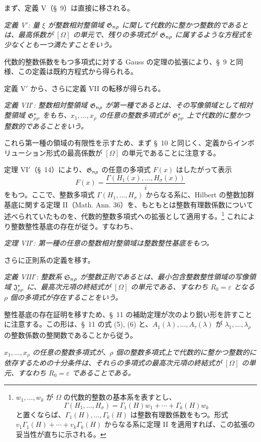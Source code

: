 \documentclass[11pt]{jlreq}
\newcommand{\eps}{\varepsilon}
\begin{document}
まず、定義 V（\S\ 9）は直接に移される。

\emph{定義 V$'$: 量 $\xi$ が整数相対整領域 $\mathfrak{G}_{n\rho}$ に関して代数的に整かつ整数的であるとは、最高係数が $[\Omega]$ の単元で、残りの多項式が $\mathfrak{G}_{n\rho}$ に属するような方程式を少なくとも一つ満たすことをいう。}

代数的整数係数をもつ多項式に対する Gauss の定理の拡張により、\S\ 9 と同様、この定義は既約方程式から得られる。

定義 V$'$ から、さらに定義 VII の転移が得られる。

\emph{定義 VII$'$: 整数相対整領域 $\mathfrak{G}_{n\rho}$ が第一種であるとは、その写像領域として相対整領域 $\mathfrak{G}^*_{\rho\rho}$ をもち、$x_1,\ldots,x_\rho$ の任意の整数多項式が $\mathfrak{G}^*_{\rho\rho}$ 上で代数的に整かつ整数的であることをいう。}

これら第一種の領域の有限性を示すため、まず \S\ 10 と同じく、定義からインボリューション形式の最高係数が $[\Omega]$ の単元であることに注意する。

定理 VI$'$（\S\ 14）により、$\mathfrak{G}_{n\rho}$ の任意の多項式 $F(x)$ はしたがって表示
\[
  F(x)=\frac{\Gamma(H_1(x),\ldots,H_\sigma(x))}{i}
\]
をもつ。ここで、整数多項式 $\Gamma(H_1,\ldots,H_\sigma)$ からなる系に、Hilbert の整数加群基底に関する定理 II（Math. Ann. 36）を、もともとは整数有理数係数について述べられていたものを、代数的整数多項式への拡張として適用する。\footnote{$w_1,\ldots,w_k$ が $\Omega$ の代数的整数の基本系を表すとし、
\[
  \Gamma(H_1,\ldots,H_\sigma)=\Gamma_1(H)w_1+\cdots+\Gamma_k(H)w_k
\]
と置くならば、$\Gamma_1(H),\ldots,\Gamma_k(H)$ は整数有理数係数をもつ。形式 $v_1\Gamma_1(H)+\cdots+v_k\Gamma_k(H)$ からなる系に定理 II を適用すれば、この拡張の妥当性が直ちに示される。} これにより整数整性基底の存在が従う。すなわち、

\emph{定理 VII$'$: 第一種の任意の整数相対整領域は整数整性基底をもつ。}

さらに正則系の定義を移す。

\emph{定義 VIII$'$: 整数系 $\mathfrak{S}_{n\rho}$ が整数正則であるとは、最小包含整数整性領域の写像領域 $\mathfrak{J}^*_{\rho\rho}$ に、最高次元項の終結式が $[\Omega]$ の単元である、すなわち $R_0=\eps$ となる $\rho$ 個の多項式が存在することをいう。}

整性基底の存在証明を移すため、\S\ 11 の補助定理が次のより鋭い形を許すことに注意する。この形は、\S\ 11 の式 (5), (6) と、$A_1(\lambda),\ldots,A_\tau(\lambda)$ が $\lambda_1,\ldots,\lambda_\rho$ の整数係数の整関数であることから従う。

\emph{$x_1,\ldots,x_\rho$ の任意の整数多項式が、$\rho$ 個の整数多項式上で代数的に整かつ整数的に依存するための十分条件は、それらの多項式の最高次元項の終結式が $[\Omega]$ の単元、すなわち $R_0=\eps$ であることである。}
\end{document}
